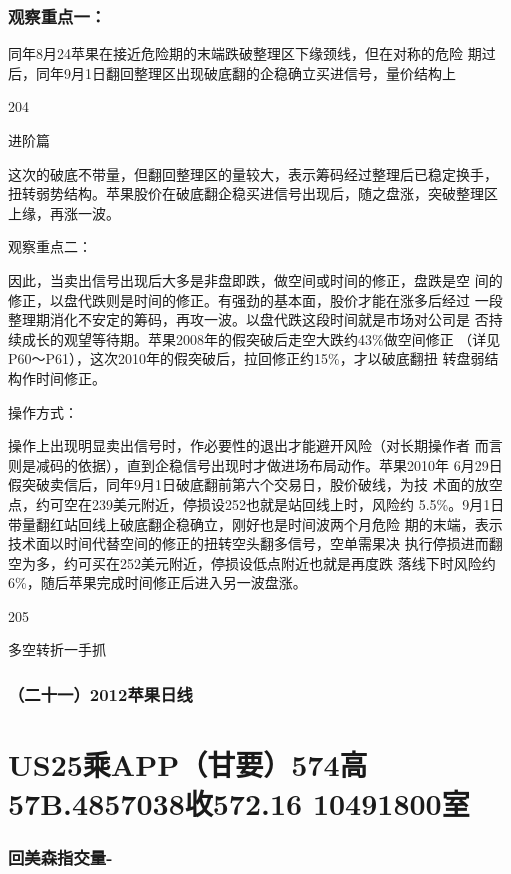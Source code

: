 \documentclass{article}
\begin{document}
\subsubsection{观察重点一：}

同年8月24苹果在接近危险期的末端跌破整理区下缘颈线，但在对称的危险 期过后，同年9月1日翻回整理区出现破底翻的企稳确立买进信号，量价结构上

204

\clearpage

进阶篇

这次的破底不带量，但翻回整理区的量较大，表示筹码经过整理后已稳定换手， 扭转弱势结构。苹果股价在破底翻企稳买进信号出现后，随之盘涨，突破整理区 上缘，再涨一波。

观察重点二：

因此，当卖出信号出现后大多是非盘即跌，做空间或时间的修正，盘跌是空 间的修正，以盘代跌则是时间的修正。有强劲的基本面，股价才能在涨多后经过 一段整理期消化不安定的筹码，再攻一波。以盘代跌这段时间就是市场对公司是 否持续成长的观望等待期。苹果2008年的假突破后走空大跌约43\%做空间修正 （详见P60～P61），这次2010年的假突破后，拉回修正约15\%，才以破底翻扭 转盘弱结构作时间修正。

操作方式：

操作上出现明显卖出信号时，作必要性的退出才能避开风险（对长期操作者 而言则是减码的依据），直到企稳信号出现时才做进场布局动作。苹果2010年 6月29日假突破卖信后，同年9月1日破底翻前第六个交易日，股价破线，为技 术面的放空点，约可空在239美元附近，停损设252也就是站回线上时，风险约 5.5\%。9月1日带量翻红站回线上破底翻企稳确立，刚好也是时间波两个月危险 期的末端，表示技术面以时间代替空间的修正的扭转空头翻多信号，空单需果决 执行停损进而翻空为多，约可买在252美元附近，停损设低点附近也就是再度跌 落线下时风险约6\%，随后苹果完成时间修正后进入另一波盘涨。

205

\clearpage

多空转折一手抓

\subsubsection{（二十一）2012苹果日线}

\section{US25乘APP（甘要）574高57B.4857038收572.16 10491800室}

\subsubsection{回美森指交量-}
\end{document}
